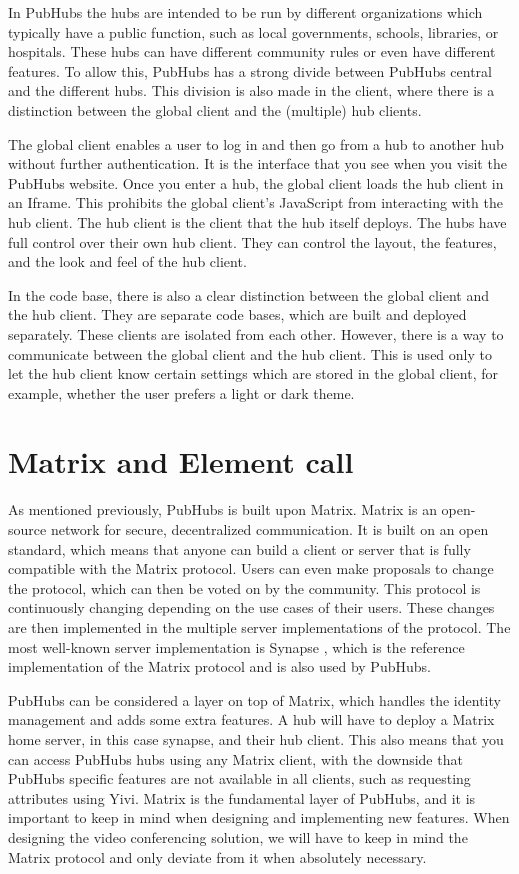\documentclass{report}
\begin{document}
In PubHubs the hubs are intended to be run by different organizations which typically have a public function, such as
local governments, schools, libraries, or hospitals.
These hubs can have different community rules or even have different features.
To allow this, PubHubs has a strong divide between PubHubs central and the different hubs.
This division is also made in the client, where there is a distinction between the global client and the (multiple) hub clients.

The global client enables a user to log in and then go from a hub to another hub without further authentication. It is
the interface that you see when you visit the PubHubs website. Once you enter a hub, the global client loads the hub
client in an Iframe. This prohibits the global client's JavaScript from interacting with the hub client.
The hub client is the client that the hub itself deploys. The hubs have full control over their own
hub client. They can control the layout, the features, and the look and feel of the hub client.

In the code base, there is also a clear distinction between the global client and the hub client. They
are separate code bases, which are built and deployed separately. These clients are isolated from each other.
However, there is a way to communicate between the global client and the hub client. This is used only to let the
hub client know certain settings which are stored in the global client, for example, whether the user prefers a
light or dark theme.

\section{Matrix and Element call}\label{sec:matrix}
As mentioned previously, PubHubs is built upon Matrix. Matrix is an open-source network for secure, decentralized
communication. It is built on an open standard, which means that anyone can build a client or server that is fully
compatible with the Matrix protocol. Users can even make proposals to change the protocol, which can then be voted on
by the community. This protocol is continuously changing depending on the use cases of their users. These changes
are then implemented in the multiple server implementations of the protocol. The most well-known server
implementation is Synapse \cite{noauthor_element-hqsynapse_nodate}, which is the reference implementation of the
Matrix protocol and is also used by PubHubs.

PubHubs can be considered a layer on top of Matrix, which handles the identity management and adds some extra features.
A hub will have to deploy a Matrix home server, in this case synapse, and their hub client. This also means that you can
access PubHubs hubs using any Matrix client, with the downside that PubHubs specific features are not available in
all clients, such as requesting attributes using Yivi. Matrix is the fundamental layer of PubHubs, and it is
important to keep in mind when designing and implementing new features. When designing the video conferencing
solution, we will have to keep in mind the Matrix protocol and only deviate from it when absolutely necessary.
\end{document}
